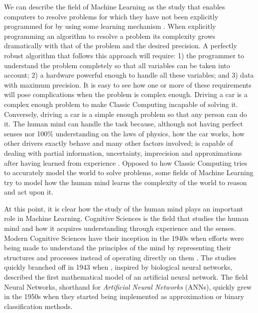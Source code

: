 We can describe the field of Machine Learning as the study that enables computers to resolve problems for which they have not been explicitly programmed for by using some learning mechanism \citet{Samuel1959}.
When explicitly programming an algorithm to resolve a problem its complexity grows dramatically with that of the problem and the desired precision.
A perfectly robust algorithm that follows this approach will require: 1) the programmer to understand the problem completely so that all variables can be taken into account; 2) a hardware powerful enough to handle all these variables; and 3) data with maximum precision.
It is easy to see how one or more of these requirements will pose complications when the problem is complex enough.
Driving a car is a complex enough problem to make Classic Computing incapable of solving it.
Conversely, driving a car is a simple enough problem so that any person can do it.
The human mind can handle the task because, although not having perfect senses nor 100\% understanding on the laws of physics, how the car works, how other drivers exactly behave and many other factors involved; is capable of dealing with partial information, uncertainty, imprecision and approximations after having learned from experience \cite{Zadeh1994}.
Opposed to how Classic Computing tries to accurately model the world to solve problems, some fields of Machine Learning try to model how the human mind learns the complexity of the world to reason and act upon it.

At this point, it is clear how the study of the human mind plays an important role in Machine Learning.
Cognitive Sciences is the field that studies the human mind and how it acquires understanding through experience and the senses.
Modern Cognitive Sciences have their inception in the 1940s when efforts were being made to understand the principles of the mind by representing their structures and processes instead of operating directly on them \cite{Thagard2008}.
The studies quickly branched off in 1943 when \citet{McCulloch1943}, inspired by biological neural networks, described the first mathematical model of an artificial neural network.
The field Neural Networks, shorthand for \emph{Artificial Neural Networks} (ANNs), quickly grew in the 1950s when they started being implemented \cite{Farley1954,Rosenblatt1958} as approximation or binary classification methods.

